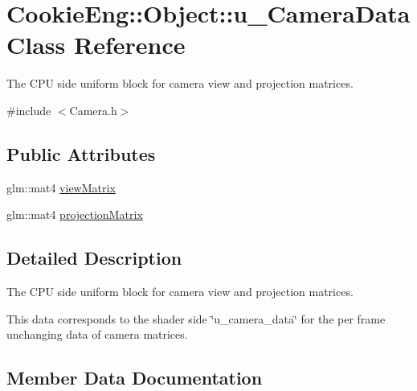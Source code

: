 \hypertarget{struct_cookie_eng_1_1_object_1_1u___camera_data}{}\section{Cookie\+Eng\+:\+:Object\+:\+:u\+\_\+\+Camera\+Data Class Reference}
\label{struct_cookie_eng_1_1_object_1_1u___camera_data}


The C\+PU side uniform block for camera view and projection matrices.  




{\ttfamily \#include $<$Camera.\+h$>$}

\subsection*{Public Attributes}
\begin{DoxyCompactItemize}
\item 
glm\+::mat4 \hyperlink{struct_cookie_eng_1_1_object_1_1u___camera_data_a1b1b0afdb4ac8c07474be855341516e4}{view\+Matrix}
\item 
glm\+::mat4 \hyperlink{struct_cookie_eng_1_1_object_1_1u___camera_data_ad96d4277fd1ef3111e1ee93353b771d7}{projection\+Matrix}
\end{DoxyCompactItemize}


\subsection{Detailed Description}
The C\+PU side uniform block for camera view and projection matrices. 

This data corresponds to the shader side \char`\"{}u\+\_\+camera\+\_\+data\char`\"{} for the per frame unchanging data of camera matrices. 

\subsection{Member Data Documentation}
\mbox{\label{struct_cookie_eng_1_1_object_1_1u___camera_data_ad96d4277fd1ef3111e1ee93353b771d7}} 
